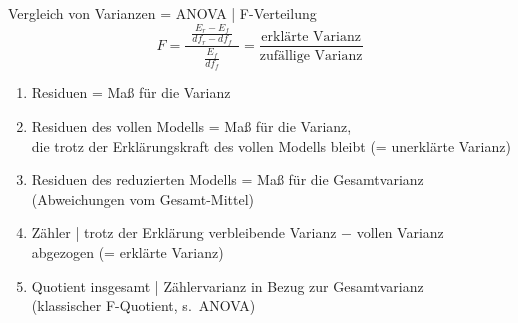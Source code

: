 \begin{frame}
  {Vergleich von Varianzen = ANOVA | F-Verteilung}
  \begin{equation}
    F=\frac{\ \ \frac{E_r-E_f}{df_r-df_f}\ \ }{\frac{E_f}{df_f}}=\frac{\text{erklärte Varianz}}{\text{zufällige\ Varianz}}
  \end{equation}

  \Zeile
  \begin{enumerate}
    \item Residuen = Maß für die Varianz
    \item Residuen des vollen Modells = Maß für die Varianz,\\
      die trotz der Erklärungskraft des vollen Modells bleibt (= unerklärte Varianz)
    \item Residuen des reduzierten Modells = Maß für die Gesamtvarianz\\
      (Abweichungen vom Gesamt-Mittel)
    \item Zähler | trotz der Erklärung verbleibende Varianz $-$ vollen Varianz\\
      abgezogen (=  erklärte Varianz)
    \item Quotient insgesamt | Zählervarianz in Bezug zur Gesamtvarianz\\
      (klassischer F-Quotient, s.\ ANOVA)
  \end{enumerate}
\end{frame}

